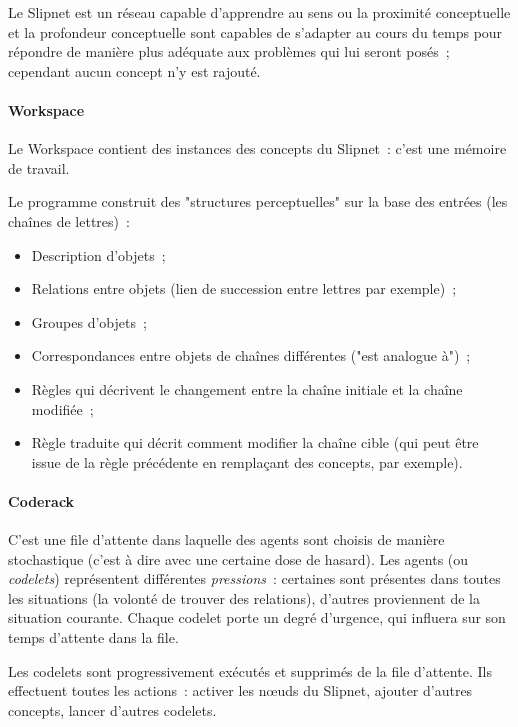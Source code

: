 \documentclass[a4paper, 12pt]{article}
\begin{document}
Le Slipnet est un réseau capable d'apprendre au sens ou la proximité conceptuelle et la profondeur conceptuelle sont capables de s'adapter au cours du temps pour répondre de manière plus adéquate aux problèmes qui lui seront posés~; cependant aucun concept n'y est rajouté.

\paragraph{Workspace}
Le Workspace contient des instances des concepts du Slipnet~: c'est une mémoire de travail.%


Le programme construit des "structures perceptuelles" sur la base des entrées (les chaînes de lettres)~:
\begin{itemize}
 \item Description d'objets~;
 \item Relations entre objets (lien de succession entre lettres par exemple)~;
 \item Groupes d'objets~;
 \item Correspondances entre objets de chaînes différentes ("est analogue à")~;
 \item Règles qui décrivent le changement entre la chaîne initiale et la chaîne modifiée~;
 \item Règle traduite qui décrit comment modifier la chaîne cible (qui peut être issue de la règle précédente en remplaçant des concepts, par exemple).
\end{itemize}


\paragraph{Coderack}
C'est une file d'attente dans laquelle des agents sont choisis de manière stochastique (c'est à dire avec une certaine dose de hasard). Les agents (ou \textit{codelets}) représentent différentes \textit{pressions}~: certaines sont présentes dans toutes les situations (la volonté de trouver des relations), d'autres proviennent de la situation courante. Chaque codelet porte un degré d'urgence, qui influera sur son temps d'attente dans la file.

Les codelets sont progressivement exécutés et supprimés de la file d'attente. Ils effectuent toutes les actions~: activer les n\oe{}uds du Slipnet, ajouter d'autres concepts, lancer d'autres codelets.
\end{document}
